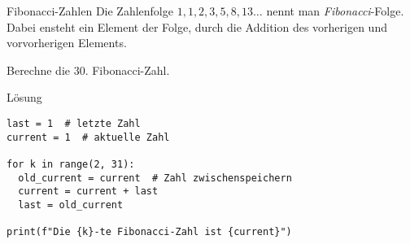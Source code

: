 \begin{fragile}
	
	
\begin{block}{Fibonacci-Zahlen}
\vspace{2pt}
Die Zahlenfolge $1,1,2,3,5,8,13\ldots$ nennt man \emph{Fibonacci}-Folge. Dabei ensteht ein Element der Folge, durch die Addition des vorherigen und vorvorherigen Elements. 

\vspace{1pt}

Berechne die 30. Fibonacci-Zahl.  
\end{block}
\vspace{12pt}
\begin{solutionblock}{Lösung}
\begin{verbatim}
last = 1  # letzte Zahl
current = 1  # aktuelle Zahl

for k in range(2, 31):
  old_current = current  # Zahl zwischenspeichern
  current = current + last
  last = old_current

print(f"Die {k}-te Fibonacci-Zahl ist {current}")
\end{verbatim}
\end{solutionblock}
	
\end{fragile}










	




